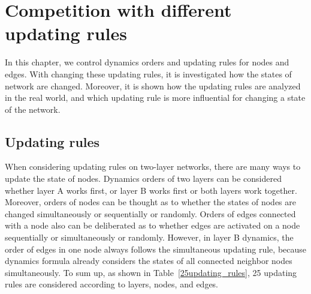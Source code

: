 
\chapter{Competition with different updating rules}
\label{chap4}
In this chapter, we control dynamics orders and updating rules for nodes and edges. With changing these updating rules, it is investigated how the states of network are changed. Moreover, it is shown how the updating rules are analyzed in the real world, and which updating rule is more influential for changing a state of the network.\\

\section{Updating rules}

When considering updating rules on two-layer networks, there are many ways to update the state of nodes. Dynamics orders of two layers can be considered whether layer A works first, or layer B works first or both layers work together. Moreover, orders of nodes can be thought as to whether the states of nodes are changed simultaneously or sequentially or randomly. Orders of edges connected with a node also can be deliberated as to whether edges are activated on a node sequentially or simultaneously or randomly. However, in layer B dynamics, the order of edges in one node always follows the simultaneous updating rule, because dynamics formula already considers the states of all connected neighbor nodes simultaneously. To sum up, as shown in Table~\ref{25updating_rules}, 25 updating rules are considered according to layers, nodes, and edges.

